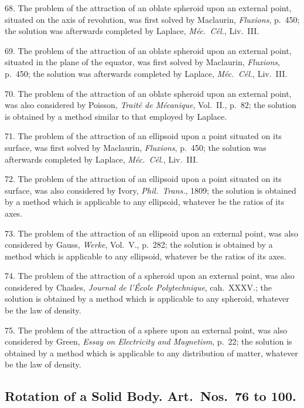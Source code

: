 \documentclass[11pt,a4paper]{book}
\begin{document}
68. The problem of the attraction of an oblate spheroid upon an external point, situated on the axis of revolution, was first solved by Maclaurin, \textit{Fluxions}, p.~450; the solution was afterwards completed by Laplace, \textit{M\'ec.\ C\'el.}, Liv.~III.

69. The problem of the attraction of an oblate spheroid upon an external point, situated in the plane of the equator, was first solved by Maclaurin, \textit{Fluxions}, p.~450; the solution was afterwards completed by Laplace, \textit{M\'ec.\ C\'el.}, Liv.~III.

\newpage
\setcounter{page}{531}

70. The problem of the attraction of an oblate spheroid upon an external point, was also considered by Poisson, \textit{Trait\'e de M\'ecanique}, Vol.~II., p.~82; the solution is obtained by a method similar to that employed by Laplace.

71. The problem of the attraction of an ellipsoid upon a point situated on its surface, was first solved by Maclaurin, \textit{Fluxions}, p.~450; the solution was afterwards completed by Laplace, \textit{M\'ec.\ C\'el.}, Liv.~III.

72. The problem of the attraction of an ellipsoid upon a point situated on its surface, was also considered by Ivory, \textit{Phil.\ Trans.}, 1809; the solution is obtained by a method which is applicable to any ellipsoid, whatever be the ratios of its axes.

73. The problem of the attraction of an ellipsoid upon an external point, was also considered by Gauss, \textit{Werke}, Vol.~V., p.~282; the solution is obtained by a method which is applicable to any ellipsoid, whatever be the ratios of its axes.

74. The problem of the attraction of a spheroid upon an external point, was also considered by Chasles, \textit{Journal de l'\'Ecole Polytechnique}, cah.~XXXV.; the solution is obtained by a method which is applicable to any spheroid, whatever be the law of density.

75. The problem of the attraction of a sphere upon an external point, was also considered by Green, \textit{Essay on Electricity and Magnetism}, p.~22; the solution is obtained by a method which is applicable to any distribution of matter, whatever be the law of density.

\subsection*{Rotation of a Solid Body. Art.\ Nos.\ 76 to 100.}
\end{document}
